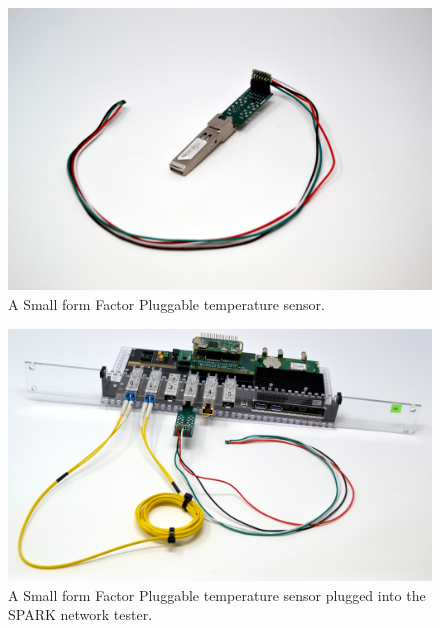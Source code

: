 \documentclass[12pt]{article}
\begin{document}
\begin{figure}
  \centering
  \includegraphics[width=\textwidth]{sfp.JPG}
  \caption{A Small form Factor Pluggable temperature sensor.}
  \label{ref:temp-sfp}
\end{figure}


\begin{figure}
  \centering
  \includegraphics[width=\textwidth]{spark.JPG}
  \caption{A Small form Factor Pluggable temperature sensor plugged into the SPARK network tester.}
  \label{ref:temp-sfp-spark}
\end{figure}

\newpage
\end{document}

